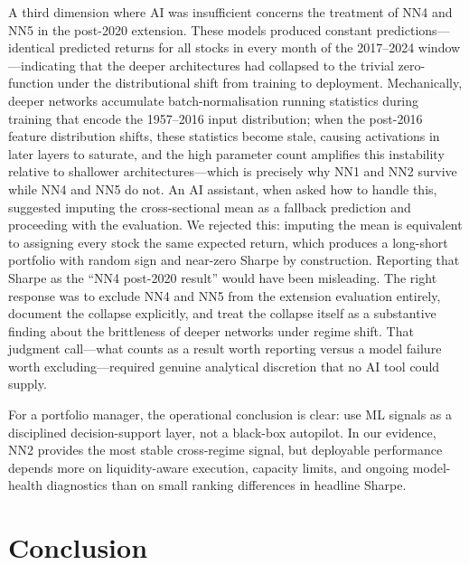 \documentclass[11pt,a4paper]{article}
\begin{document}
A third dimension where AI was insufficient concerns the treatment of NN4 and NN5 in the post-2020 extension. These models produced constant predictions---identical predicted returns for all stocks in every month of the 2017--2024 window---indicating that the deeper architectures had collapsed to the trivial zero-function under the distributional shift from training to deployment. Mechanically, deeper networks accumulate batch-normalisation running statistics during training that encode the 1957--2016 input distribution; when the post-2016 feature distribution shifts, these statistics become stale, causing activations in later layers to saturate, and the high parameter count amplifies this instability relative to shallower architectures---which is precisely why NN1 and NN2 survive while NN4 and NN5 do not. An AI assistant, when asked how to handle this, suggested imputing the cross-sectional mean as a fallback prediction and proceeding with the evaluation. We rejected this: imputing the mean is equivalent to assigning every stock the same expected return, which produces a long-short portfolio with random sign and near-zero Sharpe by construction. Reporting that Sharpe as the ``NN4 post-2020 result'' would have been misleading. The right response was to exclude NN4 and NN5 from the extension evaluation entirely, document the collapse explicitly, and treat the collapse itself as a substantive finding about the brittleness of deeper networks under regime shift. That judgment call---what counts as a result worth reporting versus a model failure worth excluding---required genuine analytical discretion that no AI tool could supply.

For a portfolio manager, the operational conclusion is clear: use ML signals as a disciplined decision-support layer, not a black-box autopilot. In our evidence, NN2 provides the most stable cross-regime signal, but deployable performance depends more on liquidity-aware execution, capacity limits, and ongoing model-health diagnostics than on small ranking differences in headline Sharpe.

\section{Conclusion}
\end{document}
